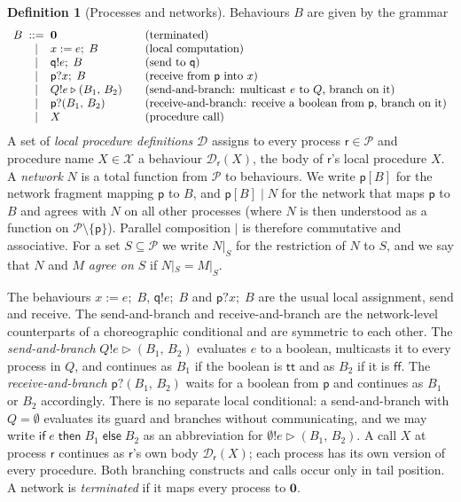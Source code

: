 \documentclass[11pt]{article}
\theoremstyle{plain}
\theoremstyle{definition}
\newtheorem{definition}[theorem]{Definition}
\theoremstyle{remark}
\newcommand{\kw}[1]{\mathsf{#1}}
\newcommand{\kif}{\kw{if}\;}
\newcommand{\kthen}{\;\kw{then}\;}
\newcommand{\kelse}{\;\kw{else}\;}
\newcommand{\nil}{\mathbf{0}}
\newcommand{\ttrue}{\mathsf{tt}}
\newcommand{\ffalse}{\mathsf{ff}}
\newcommand{\seq}{;\;}
\newcommand{\pp}{\mathsf{p}}
\newcommand{\qq}{\mathsf{q}}
\newcommand{\rr}{\mathsf{r}}
\newcommand{\Procs}{\mathcal{P}}
\newcommand{\restr}[2]{#1|_{#2}}
\newcommand{\sendbr}[4]{#1!#2 \mathbin{\triangleright} (#3,\, #4)}
\newcommand{\recvbr}[3]{#1?(#2,\, #3)}
\newcommand{\pif}[3]{\kif #1 \kthen #2 \kelse #3}
\newcommand{\Pnames}{\mathcal{X}}
\newcommand{\NDefs}{\mathcal{D}}
\newcommand{\ldef}[2]{\NDefs_{#1}(#2)}
\begin{document}
\begin{definition}[Processes and networks]\label{def:net-syntax}
  Behaviours $B$ are given by the grammar
  \[
  \begin{array}{r@{\;\;}c@{\;\;}l@{\qquad}l}
    B & ::= & \nil & \text{(terminated)}\\
      & \mid & x := e \seq B & \text{(local computation)}\\
      & \mid & \qq!e \seq B & \text{(send to $\qq$)}\\
      & \mid & \pp?x \seq B & \text{(receive from $\pp$ into $x$)}\\
      & \mid & \sendbr{Q}{e}{B_1}{B_2} & \text{(send-and-branch: multicast $e$ to $Q$, branch on it)}\\
      & \mid & \recvbr{\pp}{B_1}{B_2} & \text{(receive-and-branch: receive a boolean from $\pp$, branch on it)}\\
      & \mid & X & \text{(procedure call)}
  \end{array}
  \]
  A set of \emph{local procedure definitions} $\NDefs$ assigns to every
  process $\rr\in\Procs$ and procedure name $X\in\Pnames$ a behaviour
  $\ldef{\rr}{X}$, the body of $\rr$'s local procedure $X$.
  A \emph{network} $N$ is a total function from $\Procs$ to behaviours.  We
  write $\pp[B]$ for the network fragment mapping $\pp$ to $B$, and
  $\pp[B] \mid N$ for the network that maps $\pp$ to $B$ and agrees with $N$
  on all other processes (where $N$ is then understood as a function on
  $\Procs\setminus\{\pp\}$).  Parallel composition $\mid$ is therefore
  commutative and associative.  For a set $S\subseteq\Procs$ we write
  $\restr{N}{S}$ for the restriction of $N$ to $S$, and we say that $N$ and
  $M$ \emph{agree on $S$} if $\restr{N}{S} = \restr{M}{S}$.
\end{definition}

The behaviours $x := e\seq B$, $\qq!e\seq B$ and $\pp?x\seq B$ are the usual
local assignment, send and receive.  The send-and-branch and
receive-and-branch are the network-level counterparts of a choreographic
conditional and are symmetric to each other.  The \emph{send-and-branch}
$\sendbr{Q}{e}{B_1}{B_2}$ evaluates $e$ to a boolean, multicasts it to every
process in $Q$, and continues as $B_1$ if the boolean is $\ttrue$ and as $B_2$
if it is $\ffalse$.  The \emph{receive-and-branch} $\recvbr{\pp}{B_1}{B_2}$
waits for a boolean from $\pp$ and continues as $B_1$ or $B_2$ accordingly.
There is no separate local conditional: a send-and-branch with
$Q = \emptyset$ evaluates its guard and branches without communicating, and
we may write $\pif{e}{B_1}{B_2}$ as an abbreviation for
$\sendbr{\emptyset}{e}{B_1}{B_2}$.  A call $X$ at process $\rr$ continues as
$\rr$'s own body $\ldef{\rr}{X}$; each process has its own version of every
procedure.  Both branching constructs and calls occur only in tail position.
A network is \emph{terminated} if it maps every process to $\nil$.
\end{document}
